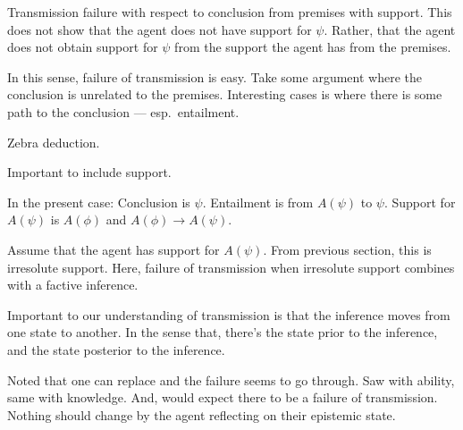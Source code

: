 \documentclass[10pt]{article}
\newcommand{\hozlinedash}[0]{%
  \noindent\hdashrule[0.5ex][c]{\textwidth}{.1pt}{2.5pt}
}
\begin{document}
\begin{note}
  Transmission failure with respect to conclusion from premises with support.
  This does not show that the agent does not have support for \(\psi\).
  Rather, that the agent does not obtain support for \(\psi\) from the support the agent has from the premises.

  In this sense, failure of transmission is easy.
  Take some argument where the conclusion is unrelated to the premises.
  Interesting cases is where there is some path to the conclusion --- esp.\ entailment.

  Zebra deduction.

  Important to include support.

  In the present case:
  Conclusion is \(\psi\).
  Entailment is from \(A(\psi)\) to \(\psi\).
  Support for \(A(\psi)\) is \(A(\phi)\) and \(A(\phi) \rightarrow A(\psi)\).

  Assume that the agent has support for \(A(\psi)\).
  From previous section, this is irresolute support.
  Here, failure of transmission when irresolute support combines with a factive inference.

  Important to our understanding of transmission is that the inference moves from one state to another.
  In the sense that, there's the state prior to the inference, and the state posterior to the inference.
\end{note}



\hozlinedash

\begin{note}
  Noted that one can replace and the failure seems to go through.
  Saw with ability, same with knowledge.
  And, would expect there to be a failure of transmission.
  Nothing should change by the agent reflecting on their epistemic state.
\end{note}
\end{document}
